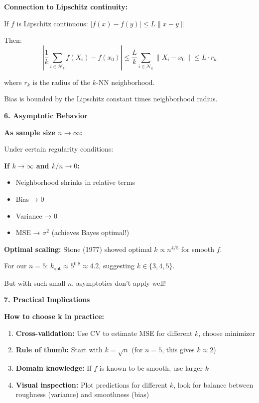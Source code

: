 \documentclass[12pt]{article}
\begin{document}
\begin{explanation}
\textbf{Connection to Lipschitz continuity:}

If \(f\) is Lipschitz continuous: \(|f(x) - f(y)| \leq L \|x - y\|\)

Then:
\[
\left|\frac{1}{k}\sum_{i \in \mathcal{N}_k} f(X_i) - f(x_0)\right| \leq \frac{L}{k}\sum_{i \in \mathcal{N}_k} \|X_i - x_0\| \leq L \cdot r_k
\]

where \(r_k\) is the radius of the \(k\)-NN neighborhood.

Bias is bounded by the Lipschitz constant times neighborhood radius.

\textbf{6. Asymptotic Behavior}

\textbf{As sample size \(n \to \infty\):}

Under certain regularity conditions:

\textbf{If \(k \to \infty\) and \(k/n \to 0\):}
\begin{itemize}
    \item Neighborhood shrinks in relative terms
    \item Bias → 0
    \item Variance → 0
    \item MSE → \(\sigma^2\) (achieves Bayes optimal!)
\end{itemize}

\textbf{Optimal scaling:} Stone (1977) showed optimal \(k \propto n^{4/5}\) for smooth \(f\).

For our \(n=5\): \(k_{\text{opt}} \approx 5^{0.8} \approx 4.2\), suggesting \(k \in \{3, 4, 5\}\).

But with such small \(n\), asymptotics don't apply well!

\textbf{7. Practical Implications}

\textbf{How to choose k in practice:}

\begin{enumerate}
    \item \textbf{Cross-validation:} Use CV to estimate MSE for different \(k\), choose minimizer
    \item \textbf{Rule of thumb:} Start with \(k = \sqrt{n}\) (for \(n=5\), this gives \(k \approx 2\))
    \item \textbf{Domain knowledge:} If \(f\) is known to be smooth, use larger \(k\)
    \item \textbf{Visual inspection:} Plot predictions for different \(k\), look for balance between roughness (variance) and smoothness (bias)
\end{enumerate}


\end{explanation}
\end{document}
